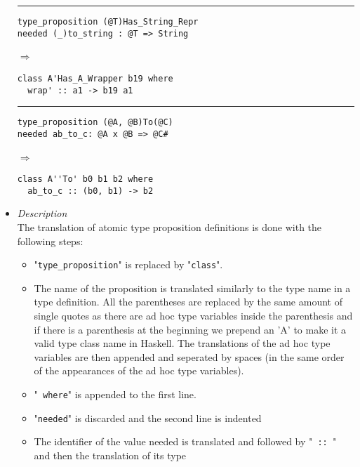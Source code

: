 \documentclass{article}
\def\H{Haskell}
\def\lra{$\Longrightarrow$\ }
\begin{document}
\begin{itemize}
\begin{minipage}{0.40\linewidth}
\rule{\linewidth}{0.1pt}

\begin{verbatim}
type_proposition (@T)Has_String_Repr
needed (_)to_string : @T => String
\end{verbatim}

\lra

\begin{verbatim}
class A'Has_A_Wrapper b19 where
  wrap' :: a1 -> b19 a1
\end{verbatim}

\rule{\linewidth}{0.1pt}

\begin{verbatim}
type_proposition (@A, @B)To(@C)
needed ab_to_c: @A x @B => @C#
\end{verbatim}

\lra

\begin{verbatim}
class A''To' b0 b1 b2 where
  ab_to_c :: (b0, b1) -> b2
\end{verbatim}

\end{minipage}

\item
\textit{Description}\\

The translation of atomic type proposition definitions is done with the
following steps:

\begin{itemize}

\item
"\texttt{type_proposition}" is replaced by "\texttt{class}".

\item
The name of the proposition is translated similarly to the type name in a type
definition. All the parentheses are replaced by the same amount of single
quotes as there are ad hoc type variables inside the parenthesis and if there
is a parenthesis at the beginning we prepend an 'A' to make it a valid
type class name in \H. The translations of the ad hoc type variables are then
appended and seperated by spaces (in the same order of the appearances of
the ad hoc type variables).

\item
"\texttt{ where}" is appended to the first line.

\item
"\texttt{needed}" is discarded and the second line is indented

\item
The identifier of the value needed is translated and followed by "\verb| :: |"
and then the translation of its type

\end{itemize}

\end{itemize}
\end{document}
